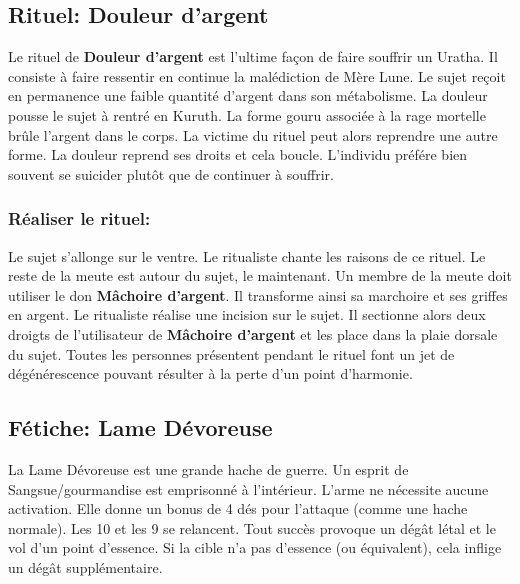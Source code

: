 \documentclass[oneside,12pt]{book}
\begin{document}
\begin{flushleft}
\subsection{Rituel: Douleur d'argent}
Le rituel de \textbf{Douleur d'argent} est l'ultime façon de faire souffrir un Uratha. 
Il consiste à faire ressentir en continue la malédiction de Mère Lune.
Le sujet reçoit en permanence une faible quantité d'argent dans son métabolisme. 
La douleur pousse le sujet à rentré en Kuruth. La forme gouru associée à la rage mortelle brûle l'argent dans le corps.
La victime du rituel peut alors reprendre une autre forme. La douleur reprend ses droits et cela boucle. 
L'individu préfére bien souvent se suicider plutôt que de continuer à souffrir.

\subsubsection{Réaliser le rituel:}
Le sujet s'allonge sur le ventre. Le ritualiste chante les raisons de ce rituel. 
Le reste de la meute est autour du sujet, le maintenant. 
Un membre de la meute doit utiliser le don \textbf{Mâchoire d'argent}. Il transforme ainsi sa marchoire et ses griffes en argent.
Le ritualiste réalise une incision sur le sujet. 
Il sectionne alors deux droigts de l'utilisateur de \textbf{Mâchoire d'argent} et les place dans la plaie dorsale du sujet.
Toutes les personnes présentent pendant le rituel font un jet de dégénérescence pouvant résulter à la perte
d'un point d'harmonie.

\subsection{Fétiche: Lame Dévoreuse}
\label{devoreuse}
La Lame Dévoreuse est une  grande hache de guerre. 
Un esprit de Sangsue/gourmandise est emprisonné à l'intérieur. 
L'arme ne nécessite aucune activation. Elle donne un bonus de 4 dés pour l'attaque (comme une hache normale).
Les 10 et les 9 se relancent. 
Tout succès provoque un dégât létal et le vol d'un point d'essence. Si la cible n'a pas d'essence (ou équivalent),
cela inflige un dégât supplémentaire.  





\end{flushleft}
\end{document}
